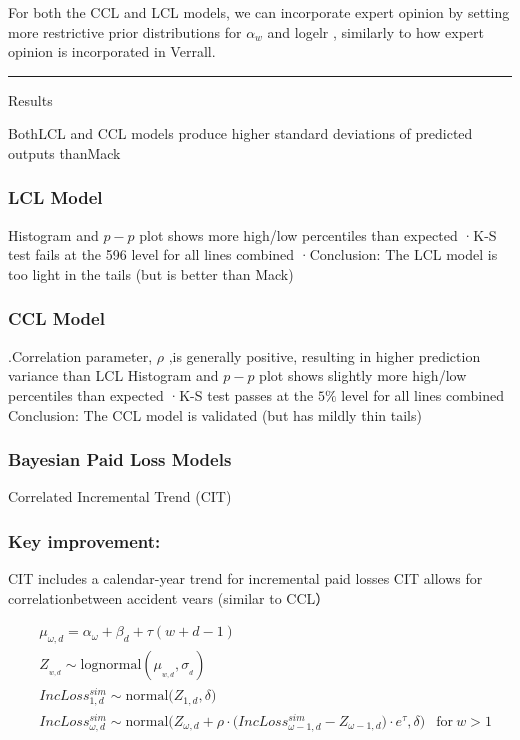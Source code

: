 \documentclass[
]{article}
\begin{document}
For both the CCL and LCL models, we can incorporate expert opinion by
setting more restrictive prior distributions for \(\alpha_{w}\) and
logelr , similarly to how expert opinion is incorporated in Verrall.

\begin{center}\rule{0.5\linewidth}{0.5pt}\end{center}

Results

BothLCL and CCL models produce higher standard deviations of predicted
outputs thanMack

\subsubsection{LCL Model}\label{lcl-model}

Histogram and \(p-p\) plot shows more high/low percentiles than expected
·K-S test fails at the 596 level for all lines combined ·Conclusion: The
LCL model is too light in the tails (but is better than Mack)

\subsubsection{CCL Model}\label{ccl-model}

.Correlation parameter, \(\rho\) ,is generally positive, resulting in
higher prediction variance than LCL Histogram and \(p-p\) plot shows
slightly more high/low percentiles than expected ·K-S test passes at the
\(5\%\) level for all lines combined Conclusion: The CCL model is
validated (but has mildly thin tails)

\subsubsection{Bayesian Paid Loss
Models}\label{bayesian-paid-loss-models}

Correlated Incremental Trend (CIT)

\subsubsection{Key improvement:}\label{key-improvement}

CIT includes a calendar-year trend for incremental paid losses CIT
allows for correlationbetween accident vears (similar to CCL）

\[
\begin{aligned}
&\mu_{\omega,d}=\alpha_{\omega}+\beta_{d}+\tau(w+d-1) \\
&Z_{_{w,d}}\sim\mathrm{lognormal}(\mu_{_{w,d}},\sigma_{_d}) \\
&IncLoss_{1,d}^{sim}\sim\mathrm{normal}\big(Z_{1,d},\delta\big) \\
&IncLoss_{\omega,d}^{sim}\sim\mathrm{normal}\Big(Z_{\omega,d}+\rho\cdot\Big(IncLoss_{\omega-1,d}^{sim}-Z_{\omega-1,d}\Big)\cdot e^{\tau},\delta\Big)& \mathrm{for}\:w>1
\end{aligned}
\]
\end{document}
